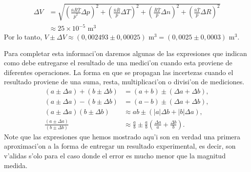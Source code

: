 \documentclass[a4paper]{report}
\begin{document}
\begin{align}
\Delta V &= \sqrt{\left(\frac{\overline{n}\overline{R}\overline{T}}{\overline{p}^2}\Delta p\right)^2+
\left(\frac{\overline{n}\overline{R}}{\overline{p}}\Delta T\right)^2 +
\left(\frac{\overline{R}\overline{T}}{\overline{p}}\Delta n\right)^2 
+\left(\frac{\overline{n}\overline{T}}{\overline{p}}\Delta R\right)^2} \\
&\approx 25\times 10^{-5}\text{ m}^3
\end{align}
Por lo tanto, $V\pm\Delta V\approx (0,002493\pm 0,00025)\text{ m}^3=(0,0025\pm 0,0003)\text{ m}^3$.

Para completar esta informaci'on daremos algunas de las expresiones que indican como debe entregarse el resultado de una medici'on cuando esta proviene de diferentes operaciones. La forma en que se propagan las incertezas cuando el resultado proviene de una suma, resta, multiplicaci'on o divisi'on de mediciones.
\begin{align}
(a\pm\Delta a)+(b\pm\Delta b) &= (a+b)\pm(\Delta a+\Delta b), \\
(a\pm\Delta a)-(b\pm\Delta b) &= (a-b)\pm(\Delta a+\Delta b), \\
(a\pm\Delta a)(b\pm\Delta b) &\approx  ab\pm(|a|\Delta b+|b|\Delta a), \\
\frac{(a\pm\Delta a)}{(b\pm\Delta b)} &\approx \frac{a}{b}\pm \frac{a}{b}\left(\frac{\Delta a}{a}+\frac{\Delta b}{b}\right).
\end{align}
Note que las expresiones que hemos mostrado aqu'i son en verdad una primera aproximaci'on a la forma de entregar un resultado experimental, es decir, son v'alidas s'olo para el caso donde el error es mucho menor que la magnitud medida.
\end{document}

